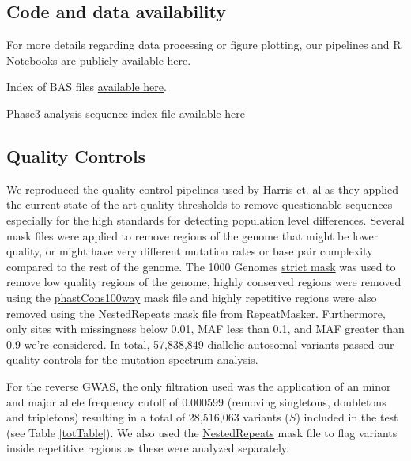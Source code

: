 \documentclass[custompaper]{MBE}%
\begin{document}
\subsection{Code and data availability}
For more details regarding data processing or figure plotting, our pipelines and R Notebooks are publicly available \href{https://github.com/LukeAndersonTrocme/QualityPaper}{here}.

Index of BAS files \href{http://ftp.1000genomes.ebi.ac.uk/vol1/ftp/data_collections/1000_genomes_project/1000genomes.low_coverage.GRCh38DH.alignment.index}{available here}.

Phase3 analysis sequence index file  \href{http://ftp.1000genomes.ebi.ac.uk/vol1/ftp/phase3/20130502.phase3.analysis.sequence.index}{available here} 

\subsection{Quality Controls}
We reproduced the quality control pipelines used by Harris et. al as they applied the current state of the art quality thresholds to remove questionable sequences especially for the high standards for detecting population level differences. 
Several mask files were applied to remove regions of the genome that might be lower quality, or might have very different mutation rates or base pair complexity compared to the rest of the genome. 
The  1000 Genomes \href{http://ftp.1000genomes.ebi.ac.uk/vol1/ftp/release/20130502/supporting/accessible_genome_masks/20141020.strict_mask.whole_genome.bed}{strict mask} was used to remove low quality regions of the genome, highly conserved regions were removed using the \href{http://hgdownload.cse.ucsc.edu/goldenPath/hg19/database/phastConsElements100way.txt.gz}{phastCons100way} mask file and highly repetitive regions were also removed using the \href{http://hgdownload.cse.ucsc.edu/goldenpath/hg19/database/nestedRepeats.txt.gz}{NestedRepeats} mask file from RepeatMasker. 
Furthermore, only sites with missingness below 0.01, MAF less than 0.1, and MAF greater than 0.9 we're considered.
In total, 57,838,849 diallelic autosomal variants passed our quality controls for the mutation spectrum analysis.

For the reverse GWAS, the only filtration used was the application of an minor and major allele frequency cutoff of 0.000599 (removing singletons, doubletons and tripletons) resulting in a total of 28,516,063 variants ($S$) included in the test (see Table \ref{totTable}). We also used the \href{http://hgdownload.cse.ucsc.edu/goldenpath/hg19/database/nestedRepeats.txt.gz}{NestedRepeats} mask file to flag variants inside repetitive regions as these were analyzed separately.
\end{document}
